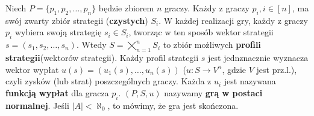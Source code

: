 \begin{definicja}
    Niech $P=\{p_1, p_2, \dots, p_n\}$ będzie zbiorem $n$ graczy. Każdy z graczy $p_i, i \in [n]$,
    ma swój zwarty zbiór strategii (\textbf{czystych}) $S_i$.
    W każdej realizacji gry, każdy z graczy $p_i$ wybiera swoją strategię $s_i \in S_i$,
    tworząc w ten sposób wektor strategii $s = (s_1, s_2, \dots, s_n)$.
    Wtedy $S = \bigtimes_{n=1}^{n} S_i$ to zbiór możliwych \textbf{profili strategii}(wektorów strategii). 
    Każdy profil strategii $s$ jest jednznacznie wyznacza wektor wypłat $u(s) = (u_1(s), \dots, u_n(s))$ ($u: S \rightarrow V^n$, gdzie $V$ jest prz.l.),
    czyli zysków (lub strat) poszczególnych graczy. Każda z $u_i$ jest nazywana \textbf{funkcją wypłat} dla gracza $p_i$. 
    $(P, S, u)$ nazywamy \textbf{grą w postaci normalnej}. Jeśli $|A| < \aleph_0$, to mówimy, że gra jest skończona.
\end{definicja}

